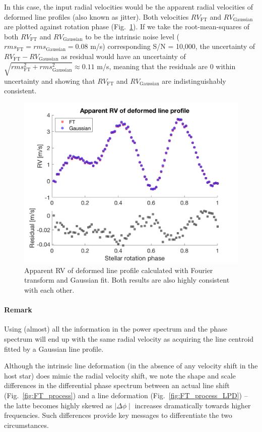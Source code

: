 In this case, the input radial velocities would be the apparent radial velocities of deformed line profiles (also known as jitter). Both velocities $RV_\text{FT}$ and $RV_\text{Gaussian}$ are plotted against rotation phase (Fig.~\ref{fig:rv_recovery_deformed}). If we take the root-mean-squares of both $RV_\text{FT}$ and $RV_\text{Gaussian}$ to be the intrinsic noise level ($rms_\text{FT} = rms_\text{Gaussian} = 0.08$ m/s) corresponding S/N = 10,000, the uncertainty of $RV_\text{FT} - RV_\text{Gaussian}$ as residual would have an uncertainty of $\sqrt{rms_\text{FT}^2+rms_\text{Gaussian}^2}\approx0.11$ m/s, meaning that the residuals are 0 within uncertainty and showing that $RV_\text{FT}$ and $RV_\text{Gaussian}$ are indistinguishably consistent. 

\begin{figure}[tbp]
\centering
\includegraphics[width = 0.7 \linewidth]
{./Figures/Methods/5-JITTER_ONLY_3.png}
\caption[Apparent RV of deformed line profile]
{Apparent RV of deformed line profile calculated with Fourier transform and Gaussian fit. Both results are also highly consistent with each other.}
\label{fig:rv_recovery_deformed}
\end{figure} 

\paragraph{Remark} Using (almost) all the information in the power spectrum and the phase spectrum will end up with the same radial velocity as acquiring the line centroid fitted by a Gaussian line profile. 

Although the intrinsic line deformation (in the absence of any velocity shift in the host star) does mimic the radial velocity shift, we note the shape and scale differences in the differential phase spectrum between an actual line shift (Fig.~\ref{fig:FT_process}) and a line deformation (Fig.~\ref{fig:FT_process_LPD}) -- the latte becomes highly skewed as $\mid\Delta \phi\mid$ increases dramatically towards higher frequencies. Such differences provide key messages to differentiate the two circumstances. 

